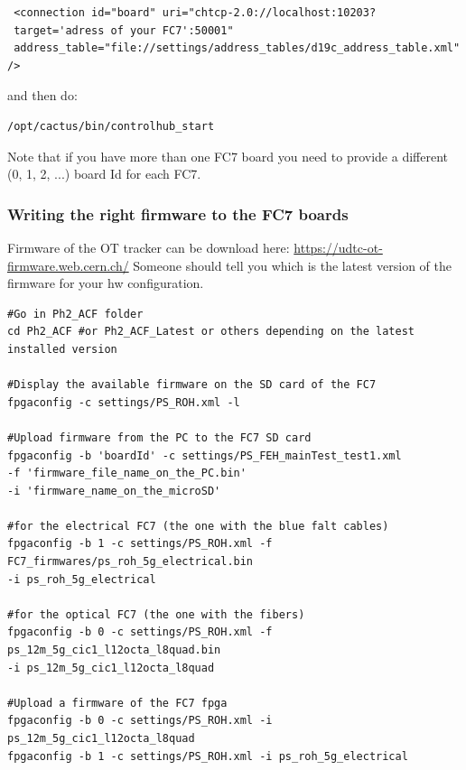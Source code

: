 \documentclass[10pt,a4paper]{article}
\begin{document}
\begin{framed}
\begin{verbatim}
 <connection id="board" uri="chtcp-2.0://localhost:10203?
 target='adress of your FC7':50001" 
 address_table="file://settings/address_tables/d19c_address_table.xml" />
\end{verbatim}
\end{framed}

and then do:
\begin{framed}
\begin{verbatim}
/opt/cactus/bin/controlhub_start
\end{verbatim}
\end{framed}

Note that if you have more than one FC7 board you need to provide a different (0, 1, 2, ...) board Id for each FC7.

\subsubsection{Writing the right firmware to the FC7 boards}
Firmware of the OT tracker can be download here: \url{https://udtc-ot-firmware.web.cern.ch/}
Someone should tell you which is the latest version of the firmware for your hw configuration.

\begin{framed}
\begin{verbatim}
#Go in Ph2_ACF folder
cd Ph2_ACF #or Ph2_ACF_Latest or others depending on the latest installed version

#Display the available firmware on the SD card of the FC7
fpgaconfig -c settings/PS_ROH.xml -l

#Upload firmware from the PC to the FC7 SD card
fpgaconfig -b 'boardId' -c settings/PS_FEH_mainTest_test1.xml 
-f 'firmware_file_name_on_the_PC.bin' 
-i 'firmware_name_on_the_microSD'

#for the electrical FC7 (the one with the blue falt cables)
fpgaconfig -b 1 -c settings/PS_ROH.xml -f FC7_firmwares/ps_roh_5g_electrical.bin 
-i ps_roh_5g_electrical

#for the optical FC7 (the one with the fibers)
fpgaconfig -b 0 -c settings/PS_ROH.xml -f ps_12m_5g_cic1_l12octa_l8quad.bin 
-i ps_12m_5g_cic1_l12octa_l8quad

#Upload a firmware of the FC7 fpga
fpgaconfig -b 0 -c settings/PS_ROH.xml -i  ps_12m_5g_cic1_l12octa_l8quad
fpgaconfig -b 1 -c settings/PS_ROH.xml -i ps_roh_5g_electrical
\end{verbatim}
\end{framed}
\end{document}
